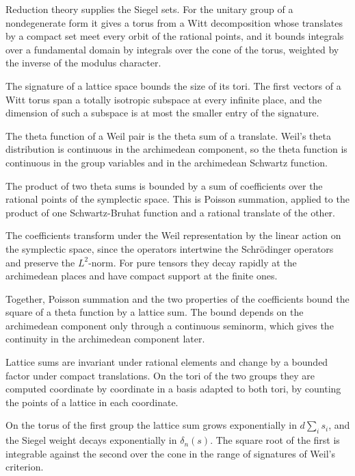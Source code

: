 Reduction theory supplies the Siegel sets. For the unitary group of a
nondegenerate form it gives a torus from a Witt decomposition whose translates
by a compact set meet every orbit of the rational points, and it bounds
integrals over a fundamental domain by integrals over the cone of the torus,
weighted by the inverse of the modulus character.

The signature of a lattice space bounds the size of its tori. The first vectors
of a Witt torus span a totally isotropic subspace at every infinite place, and
the dimension of such a subspace is at most the smaller entry of the signature.

The theta function of a Weil pair is the theta sum of a translate. Weil's theta
distribution is continuous in the archimedean component, so the theta function
is continuous in the group variables and in the archimedean Schwartz function.

The product of two theta sums is bounded by a sum of coefficients over the
rational points of the symplectic space. This is Poisson summation, applied to
the product of one Schwartz-Bruhat function and a rational translate of the
other.

The coefficients transform under the Weil representation by the linear action
on the symplectic space, since the operators intertwine the Schrödinger
operators and preserve the $L^2$-norm. For pure tensors they decay rapidly at
the archimedean places and have compact support at the finite ones.

Together, Poisson summation and the two properties of the coefficients bound
the square of a theta function by a lattice sum. The bound depends on the
archimedean component only through a continuous seminorm, which gives the
continuity in the archimedean component later.

Lattice sums are invariant under rational elements and change by a bounded
factor under compact translations. On the tori of the two groups they are
computed coordinate by coordinate in a basis adapted to both tori, by counting
the points of a lattice in each coordinate.

On the torus of the first group the lattice sum grows exponentially in
$d\sum_is_i$, and the Siegel weight decays exponentially in $\delta_n(s)$. The
square root of the first is integrable against the second over the cone in the
range of signatures of Weil's criterion.

